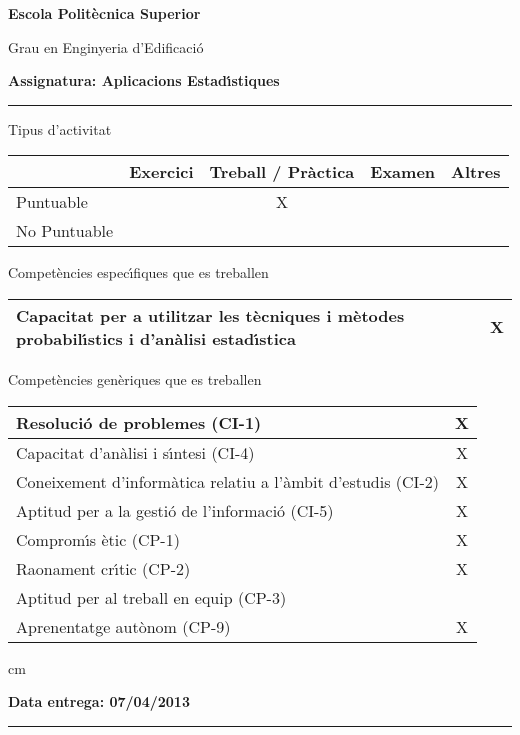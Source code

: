 \documentclass[11pt]{article}
\begin{document}
\noindent
{\large \bf Escola Polit\`ecnica Superior}

\noindent
{\large Grau en Enginyeria d'Edificaci\'o}

\vskip 0.3cm
\noindent
{\large \bf Assignatura: Aplicacions Estad\'\i stiques}

\hrule

\vskip 0.3cm

\noindent
Tipus d'activitat

\begin{tabular}{|l|c|c|c|c|}
\hline
 & Exercici & Treball / Pr\`actica & Examen & Altres \\
\hline
Puntuable & & X &  & \\ \hline
No Puntuable & & & & \\ \hline
\end{tabular}

\vskip 0.3cm

\noindent
Compet\`encies espec\'\i fiques que es treballen

\begin{tabular}{|l|c|}
\hline
Capacitat per a utilitzar les t\`ecniques i m\`etodes probabil\'\i stics i d'an\`alisi estad\'\i stica & X \\
\hline
\end{tabular}

\vskip 0.3cm

\noindent
Compet\`encies gen\`eriques que es treballen

\begin{tabular}{|l|c|}
\hline
Resoluci\'o de problemes (CI-1) & X \\ \hline
Capacitat d'an\`alisi i s\'\i ntesi (CI-4) & X \\ \hline
Coneixement d'inform\`atica relatiu a l'\`ambit d'estudis (CI-2) & X \\ \hline
Aptitud per a la gesti\'o de l'informaci\'o (CI-5) & X\\ \hline
Comprom\'\i s \`etic (CP-1) & X \\ \hline
Raonament cr\'\i tic (CP-2) & X \\ \hline
Aptitud per al treball en equip (CP-3) &  \\ \hline
Aprenentatge aut\`onom (CP-9) & X\\ \hline
\end{tabular}


 cm

\noindent
\textbf{Data entrega: 07/04/2013}

\hrule
\end{document}
